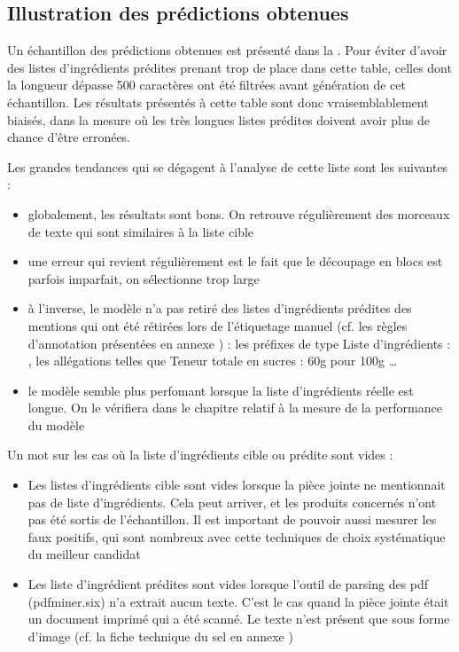         \subsection{Illustration des prédictions obtenues}
        \label{prediction_gt_illustration}
        Un échantillon des prédictions obtenues est présenté dans la .
        Pour éviter d'avoir des listes d'ingrédients prédites prenant trop de place dans cette table, celles dont la longueur dépasse 500 caractères ont été filtrées avant génération de cet échantillon.
        Les résultats présentés à cette table sont donc vraisemblablement biaisés, dans la mesure où les très longues listes prédites doivent avoir plus de chance d'être erronées.

        Les grandes tendances qui se dégagent à l'analyse de cette liste sont les suivantes : 
        \begin{itemize}
            \item globalement, les résultats sont bons. On retrouve régulièrement des morceaux de texte qui sont similaires à la liste cible
            \item une erreur qui revient régulièrement est le fait que le découpage en blocs est parfois imparfait, on sélectionne \og trop large \fg
            \item à l'inverse, le modèle n'a pas retiré des listes d'ingrédients prédites des mentions qui ont été rétirées lors de l'étiquetage manuel (cf. les règles d'annotation présentées en annexe ) : les préfixes de type \og Liste d'ingrédients : \fg, les allégations telles que \og Teneur totale en sucres : 60g pour 100g \fg \dots
            \item le modèle semble plus perfomant lorsque la liste d'ingrédients réelle est longue. On le vérifiera dans le chapitre relatif à la mesure de la performance du modèle
        \end{itemize}

        Un mot sur les cas où la liste d'ingrédients cible ou prédite sont vides :
        \begin{itemize}
            \item Les listes d'ingrédients cible sont vides lorsque la pièce jointe ne mentionnait pas de liste d'ingrédients. Cela peut arriver, et les produits concernés n'ont pas été sortis de l'échantillon. Il est important de pouvoir aussi mesurer les faux positifs, qui sont nombreux avec cette techniques de choix systématique du meilleur candidat
            \item Les liste d'ingrédient prédites sont vides lorsque l'outil de parsing des pdf (pdfminer.six) n'a extrait aucun texte. C'est le cas quand la pièce jointe était un document imprimé qui a été scanné. Le texte n'est présent que sous forme d'image (cf. la fiche technique du sel en annexe )
        \end{itemize}

